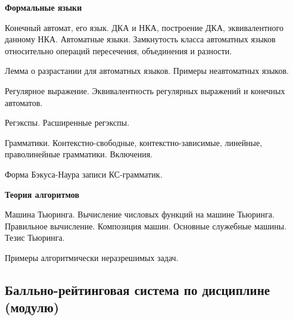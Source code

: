 \documentclass{rpd}
\begin{document}
            \smallskip
            \textbf{Формальные языки}
            \begin{examquestions}
            \item
            Конечный автомат, его язык. ДКА и НКА, построение ДКА, эквивалентного данному НКА. Автоматные языки. Замкнутость класса автоматных языков относительно операций пересечения, объединения и разности.
            \item
            Лемма о разрастании для автоматных языков. Примеры неавтоматных языков.
            \item
            Регулярное выражение. Эквивалентность регулярных выражений и конечных автоматов.
            \item
            Регэкспы. Расширенные регэкспы. 
            \item
            Грамматики. Контекстно-свободные, контекстно-зависимые, линейные, праволинейные грамматики. Включения.
            \item
            Форма Бэкуса-Наура записи КС-грамматик.
            \end{examquestions}

            \smallskip
            \textbf{Теория алгоритмов}
            \begin{examquestions}
            \item
            Машина Тьюринга. Вычисление числовых функций на машине Тьюринга. Правильное вычисление. Композиция машин. Основные служебные машины. Тезис Тьюринга.
            \item
            Примеры алгоритмически неразрешимых задач.
            \end{examquestions}

    \subsection{Балльно-рейтинговая система по дисциплине (модулю)}
\end{document}
